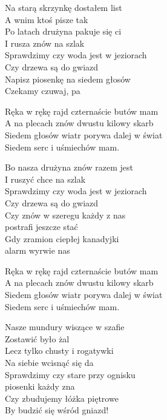 \begin{text}

    Na starą skrzynkę dostałem list\\
    A wnim ktoś pisze tak\\
    Po latach drużyna pakuje się ci\\
    I rusza znów na szlak\\
    Sprawdzimy czy woda jest w jeziorach\\
    Czy drzewa są do gwiazd\\
    Napisz piosenkę na siedem głosów\\
    Czekamy czuwaj, pa

    \vin Ręka w rękę rajd czternaście butów mam\\
    \vin A na plecach znów dwustu kilowy skarb\\
    \vin Siedem głosów wiatr porywa dalej w świat\\
    \vin Siedem serc i uśmiechów mam.

    Bo nasza drużyna znów razem jest\\
    I ruszyć chce na szlak\\
    Sprawdzimy czy woda jest w jeziorach\\
    Czy drzewa są do gwiazd\\
    Czy znów w szeregu każdy z nas\\
    postrafi jeszcze stać\\
    Gdy zramion ciepłej kanadyjki\\
    alarm wyrwie nas

    \vin Ręka w rękę rajd czternaście butów mam\\
    \vin A na plecach znów dwustu kilowy skarb\\
    \vin Siedem głosów wiatr porywa dalej w świat\\
    \vin Siedem serc i uśmiechów mam.

    Nasze mundury wiszące w szafie\\
    Zostawić było żal\\
    Lecz tylko chusty i rogatywki\\
    Na siebie wcisnąć się da\\
    Sprawdzimy czy stare przy ognisku\\
    piosenki każdy zna\\
    Czy zbudujemy łóżka piętrowe\\
    By budzić się wśród gniazd!


\end{text}
